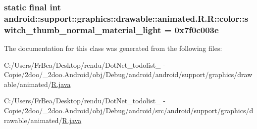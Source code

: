 \hypertarget{classandroid_1_1support_1_1graphics_1_1drawable_1_1animated_1_1_r_1_1color_2f1f9fa4abfcc45d059749e518dbf2fe}{
\subsubsection[{switch\_\-thumb\_\-normal\_\-material\_\-light}]{\setlength{\rightskip}{0pt plus 5cm}static final int android::support::graphics::drawable::animated.R.R::color::switch\_\-thumb\_\-normal\_\-material\_\-light = 0x7f0c003e}}
\label{classandroid_1_1support_1_1graphics_1_1drawable_1_1animated_1_1_r_1_1color_2f1f9fa4abfcc45d059749e518dbf2fe}




The documentation for this class was generated from the following files:\begin{CompactItemize}
\item 
C:/Users/FrBea/Desktop/rendu/DotNet\_\-todolist\_ - Copie/2doo/\_\-2doo.Android/obj/Debug/android/android/support/graphics/drawable/animated/\hyperlink{android_2support_2graphics_2drawable_2animated_2_r_8java}{R.java}\item 
C:/Users/FrBea/Desktop/rendu/DotNet\_\-todolist\_ - Copie/2doo/\_\-2doo.Android/obj/Debug/android/src/android/support/graphics/drawable/animated/\hyperlink{src_2android_2support_2graphics_2drawable_2animated_2_r_8java}{R.java}\end{CompactItemize}
